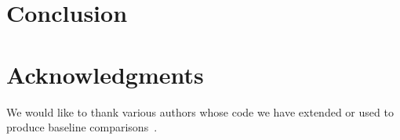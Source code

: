 \documentclass[runningheads]{llncs}
\newif\ifaccvfinal{}
\begin{document}


\section{Conclusion}

\section*{Acknowledgments}

We would like to thank various authors whose code we have extended or used to
produce baseline
comparisons~\cite{pfister2015flowing,chen2014articulated,cherian2014mixing}.




\end{document}
